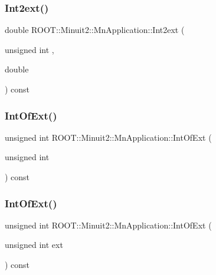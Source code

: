\subsubsection{\texorpdfstring{Int2ext()}{Int2ext()}\hspace{0.1cm}{\footnotesize\ttfamily [3/3]}}
{\footnotesize\ttfamily double R\+O\+O\+T\+::\+Minuit2\+::\+Mn\+Application\+::\+Int2ext (\begin{DoxyParamCaption}\item[{unsigned int}]{,  }\item[{double}]{ }\end{DoxyParamCaption}) const}

\mbox{\label{classROOT_1_1Minuit2_1_1MnApplication_a7911389abce948da10dd82a8a172afd5}} 
\subsubsection{\texorpdfstring{IntOfExt()}{IntOfExt()}\hspace{0.1cm}{\footnotesize\ttfamily [1/3]}}
{\footnotesize\ttfamily unsigned int R\+O\+O\+T\+::\+Minuit2\+::\+Mn\+Application\+::\+Int\+Of\+Ext (\begin{DoxyParamCaption}\item[{unsigned int}]{ }\end{DoxyParamCaption}) const}

\mbox{\label{classROOT_1_1Minuit2_1_1MnApplication_a7911389abce948da10dd82a8a172afd5}} 
\subsubsection{\texorpdfstring{IntOfExt()}{IntOfExt()}\hspace{0.1cm}{\footnotesize\ttfamily [2/3]}}
{\footnotesize\ttfamily unsigned int R\+O\+O\+T\+::\+Minuit2\+::\+Mn\+Application\+::\+Int\+Of\+Ext (\begin{DoxyParamCaption}\item[{unsigned int}]{ext }\end{DoxyParamCaption}) const}

